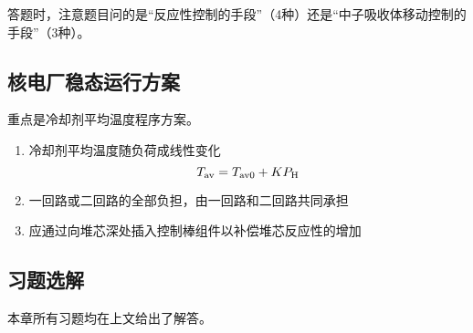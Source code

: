 答题时，注意题目问的是“反应性控制的手段”（4种）还是“中子吸收体移动控制的手段”（3种）。

\subsection{核电厂稳态运行方案}

重点是冷却剂平均温度程序方案。
\begin{enumerate}
    \item 冷却剂平均温度随负荷成线性变化
    \begin{equation}
        T_{\rm av} = T_{\rm av0} + K P_{\rm H}
    \end{equation}
    \item 一回路或二回路的全部负担，由一回路和二回路共同承担
    \item 应通过向堆芯深处插入控制棒组件以补偿堆芯反应性的增加
\end{enumerate}

\subsection{习题选解}

本章所有习题均在上文给出了解答。